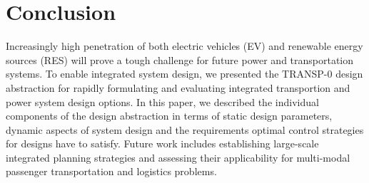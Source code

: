 \section{Conclusion}
\label{conclusion}

Increasingly high penetration of both electric vehicles (EV) and renewable energy sources (RES) will prove a tough challenge for future power and transportation systems. To enable integrated system design, we presented the TRANSP-0 design abstraction for rapidly formulating and evaluating integrated transportion and power system design options. In this paper, we described the individual components of the design abstraction in terms of static design parameters, dynamic aspects of system design and the requirements optimal control strategies for designs have to satisfy.
Future work includes establishing large-scale integrated planning strategies and assessing their applicability for multi-modal passenger transportation and logistics problems.

